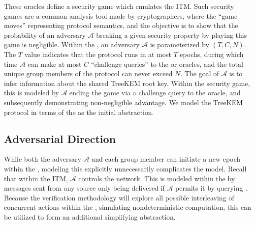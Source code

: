 \documentclass[runningheads]{llncs}
\newcommand{\Abrev}[1]{\gls{#1}}
\newcommand{\Adversary}{\ensuremath{\mathcal{A}}\xspace}
\begin{document}
These oracles define a security game \cite{shoup2004sequences} which emulates the \Abrev{ITM}.
Such security games are a common analysis tool made by cryptographers, where the ``game moves'' representing protocol semantics, and the objective is to show that the probability of an adversary \Adversary  breaking a given security property by playing this game is negligible.
Within the \CGKAsec, an adversary \Adversary is parameterized by \((T, C, N)\).
The \(T\) value indicates that the protocol runs in at most \(T\) epochs, during which time \(\mathcal{A}\) can make at most \(C\) ``challenge queries'' to the  or  oracles, and the total unique group members of the protocol can never exceed \(N\).
The goal of \Adversary is to infer information about the shared TreeKEM root key.
Within the security game, this is modeled by \Adversary  ending the game via a challenge query to the  oracle, 
and subsequently demonstrating non-negligible advantage.
We model the TreeKEM protocol in terms of the \CGKAsec as the initial abstraction.




\subsection{Adversarial Direction}
While both the adversary \Adversary and each group member can initiate a new epoch within the \CGKAsec, modeling this explicitly unnecessarily complicates the model.
Recall that within the \Abrev{ITM}, \Adversary controls the network.
This is modeled within the \CGKAsec by messages sent from any source only being delivered if \Adversary permits it by querying .
Because the verification methodology will explore all possible interleaving of concurrent actions within the \CGKAsec, simulating nondeterministic computation, this can be utilized to form an additional simplifying abstraction.
\end{document}
